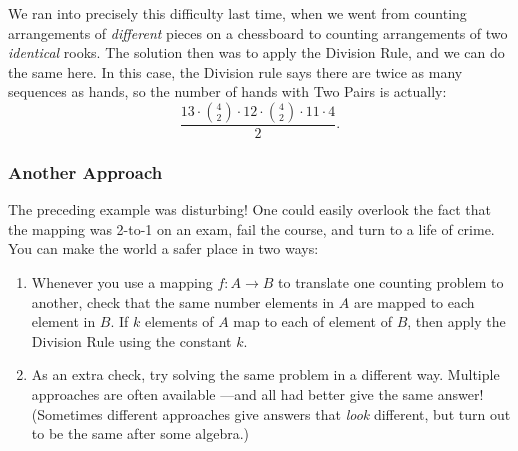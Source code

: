 We ran into precisely this difficulty last time, when we went from
counting arrangements of \emph{different} pieces on a chessboard to
counting arrangements of two \emph{identical} rooks.  The solution
then was to apply the Division Rule, and we can do the same here.  In
this case, the Division rule says there are twice as many sequences
as hands, so the number of hands with Two Pairs is actually:
%
\[
\frac{13 \cdot \binom{4}{2} \cdot 12 \cdot \binom{4}{2} \cdot 11 \cdot 4}{2}.
\]

\subsubsection*{Another Approach}

The preceding example was disturbing!  One could easily overlook the
fact that the mapping was 2-to-1 on an exam, fail the course, and turn
to a life of crime.  You can make the world a safer place in two ways:

\begin{enumerate}

\item Whenever you use a mapping $f : A \to B$ to translate one counting
  problem to another, check that the same number elements in $A$ are
  mapped to each element in $B$.  If $k$ elements of $A$ map to each of
  element of $B$, then apply the Division Rule using the constant $k$.

\item As an extra check, try solving the same problem in a different
way.  Multiple approaches are often available ---and all had better
give the same answer!  (Sometimes different approaches give answers
that \emph{look} different, but turn out to be the same after some
algebra.)

\end{enumerate}

